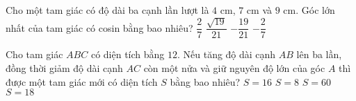 \begin{ex}%
	Cho một tam giác có độ dài ba cạnh lần lượt là $4$ cm, $7$ cm và $9$ cm. Góc lớn nhất của tam giác có cosin bằng bao nhiêu?
	\choice
	{$\dfrac{2}{7}$}
	{$\dfrac{\sqrt{19}}{21}$}
	{$-\dfrac{19}{21}$}	
	{\True $-\dfrac{2}{7}$}
\end{ex}
\begin{ex}%
	Cho tam giác $ABC$ có diện tích bằng $12$. Nếu tăng độ dài cạnh $AB$ lên ba lần, đồng thời giảm độ dài cạnh $AC$ còn một nửa và giữ nguyên độ lớn của góc $A$ thì được một tam giác mới có diện tích $S$ bằng bao nhiêu?
	\choice
	{$S=16$}
	{$S= 8$}
	{$S=60$}
	{\True $S=18$}
\end{ex}

